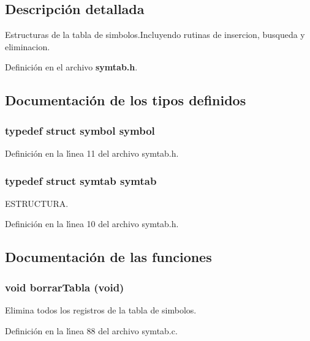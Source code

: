 \subsection{Descripci\'{o}n detallada}
Estructuras de la tabla de simbolos.Incluyendo rutinas de insercion, busqueda y eliminacion. 



Definici\'{o}n en el archivo {\bf symtab.h}.

\subsection{Documentaci\'{o}n de los tipos definidos}
\subsubsection{\setlength{\rightskip}{0pt plus 5cm}typedef struct {\bf symbol} {\bf symbol}}\label{symtab_8h_a1}




Definici\'{o}n en la l\'{\i}nea 11 del archivo symtab.h.
\subsubsection{\setlength{\rightskip}{0pt plus 5cm}typedef struct {\bf symtab} {\bf symtab}}\label{symtab_8h_a0}


ESTRUCTURA. 



Definici\'{o}n en la l\'{\i}nea 10 del archivo symtab.h.

\subsection{Documentaci\'{o}n de las funciones}
\subsubsection{\setlength{\rightskip}{0pt plus 5cm}void borrar\-Tabla (void)}\label{symtab_8h_a4}


Elimina todos los registros de la tabla de simbolos. 



Definici\'{o}n en la l\'{\i}nea 88 del archivo symtab.c.

